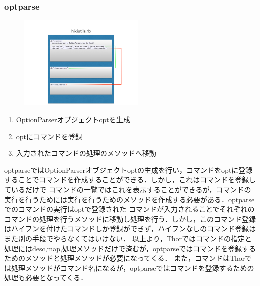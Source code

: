 \subsubsection{optparse}
\begin{figure}[htbp]\begin{center}
\includegraphics[width=6cm,bb=0 0 442 500]{../figs/./hikiutils_yamane_09_copy.005.jpg}
\caption{}
\label{default}\end{center}\end{figure}\begin{enumerate}
\item OptionParserオブジェクトoptを生成
\item optにコマンドを登録
\item 入力されたコマンドの処理のメソッドへ移動
\end{enumerate}
optparseではOptionParserオブジェクトoptの生成を行い，コマンドをoptに登録することでコマンドを作成することができる．しかし，これはコマンドを登録しているだけで
コマンドの一覧ではこれを表示することができるが，コマンドの実行を行うためには実行を行うためのメソッドを作成する必要がある．optparseでのコマンドの実行はoptで登録された
コマンドが入力されることでそれぞれのコマンドの処理を行うメソッドに移動し処理を行う．しかし，このコマンド登録はハイフンを付けたコマンドしか登録ができず，ハイフンなしのコマンド登録は
また別の手段でやらなくてはいけない．
以上より，Thorではコマンドの指定と処理にはdesc,map,処理メソッドだけで済むが，optparseではコマンドを登録するためのメソッドと処理メソッドが必要になってくる．
また，コマンドはThorでは処理メソッドがコマンド名になるが，optparseではコマンドを登録するための処理も必要となってくる．

